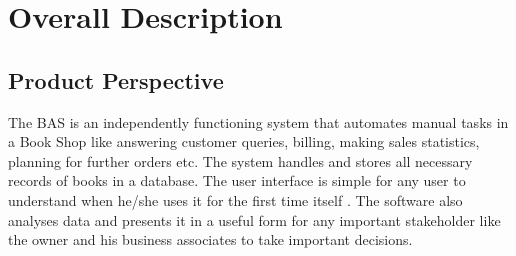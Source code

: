 \documentclass{scrreprt}
\begin{document}
\chapter{Overall Description}

\section{Product Perspective}
The BAS is an independently functioning system that automates manual  tasks in a Book Shop like answering customer queries, billing, making sales statistics, planning for further orders etc. The system handles and stores all necessary records of books in a database. The user interface is simple for any user to understand when he/she uses it for the first time itself . The software also analyses data and presents it in a useful form for any important stakeholder like the owner and his business associates to take important decisions.
\end{document}
